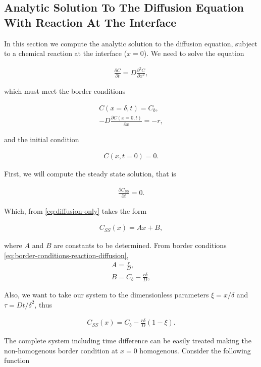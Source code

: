 \subsection{Analytic Solution To The Diffusion Equation With Reaction At The Interface}
\label{sec:analytic-diffusion-reaction}

In this section we compute the analytic solution to the diffusion equation, subject to a chemical reaction at the interface ($x = 0$).
We need to solve the equation

\begin{align}
	\frac{\partial C}{\partial t} = D\frac{\partial^2 C}{\partial x^2},
\end{align}

which must meet the border conditions

\begin{align}
	C(x = \delta, t) = C_b,\\
	-D\frac{\partial C(x = 0, t)}{\partial x} = -r,
\end{align}

and the initial condition

\begin{align}
	C(x, t = 0) = 0.
\end{align}

First, we will compute the steady state solution, that is

\begin{align}
	\frac{\partial C_{SS}}{\partial t} = 0.
\end{align}

Which, from \ref{eq:diffusion-only} takes the form

\begin{align}
	C_{SS}(x) = Ax+B,
\end{align}

where $A$ and $B$ are constants to be determined. From border conditions \ref{eq:border-conditions-reaction-diffusion},
\begin{align}
	A = \frac{r}{D},\\
	B = C_b - \frac{r\delta}{D},
\end{align}

Also, we want to take our system to the dimensionless parameters $\xi = x/\delta$ and $\tau = D t / \delta^2$, thus

\begin{align}
	C_{SS}(x) = C_b - \frac{r\delta}{D}(1-\xi).
\end{align}

The complete system including time difference can be easily treated making the non-homogenous border condition at $x=0$ homogenous. Consider the following function

